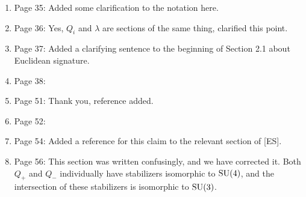 \documentclass[10pt, oneside]{article}
\begin{document}
\begin{enumerate}
 \item Page 35: Added some clarification to the notation here.
 \item Page 36: Yes, $Q_i$ and $\lambda$ are sections of the same thing, clarified this point. 
 \item Page 37: Added a clarifying sentence to the beginning of Section 2.1 about Euclidean signature. 
 \item Page 38:
 \item Page 51: Thank you, reference added.
 \item Page 52:  
 \item Page 54: Added a reference for this claim to the relevant section of [ES].
 \item Page 56: This section was written confusingly, and we have corrected it.  Both $Q_+$ and $Q_-$ individually have stabilizers isomorphic to $\mathrm{SU}(4)$, and the intersection of these stabilizers is isomorphic to $\mathrm{SU}(3)$.
\end{enumerate}

 
\end{document}
